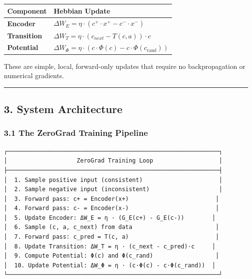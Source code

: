 \documentclass[
  11pt,
  a4paper,
]{article}
\begin{document}
\begin{longtable}[]{@{}
  >{\raggedright\arraybackslash}p{}
  >{\raggedright\arraybackslash}p{}@{}}
\toprule\noalign{}
\begin{minipage}[b]{\linewidth}\raggedright
Component
\end{minipage} & \begin{minipage}[b]{\linewidth}\raggedright
Hebbian Update
\end{minipage} \\
\midrule\noalign{}
\endhead
\bottomrule\noalign{}
\endlastfoot
\textbf{Encoder} &
\(\Delta W_E = \eta \cdot (c^+ \cdot x^+ - c^- \cdot x^-)\) \\
\textbf{Transition} &
\(\Delta W_T = \eta \cdot (c_{next} - T(c,a)) \cdot c\) \\
\textbf{Potential} &
\(\Delta W_\Phi = \eta \cdot (c \cdot \Phi(c) - c \cdot \Phi(c_{\text{rand}}))\) \\
\end{longtable}

These are simple, local, forward-only updates that require no
backpropagation or numerical gradients.

\begin{center}\rule{0.5\linewidth}{0.5pt}\end{center}

\subsection{3. System Architecture}\label{system-architecture}

\subsubsection{3.1 The ZeroGrad Training
Pipeline}\label{the-zerograd-training-pipeline}

\begin{verbatim}
┌─────────────────────────────────────────────────────────────┐
│                    ZeroGrad Training Loop                   │
├─────────────────────────────────────────────────────────────┤
│  1. Sample positive input (consistent)                      │
│  2. Sample negative input (inconsistent)                    │
│  3. Forward pass: c+ = Encoder(x+)                         │
│  4. Forward pass: c- = Encoder(x-)                         │
│  5. Update Encoder: ΔW_E = η · (G_E(c+) - G_E(c-))        │
│  6. Sample (c, a, c_next) from data                        │
│  7. Forward pass: c_pred = T(c, a)                         │
│  8. Update Transition: ΔW_T = η · (c_next - c_pred)·c     │
│  9. Compute Potential: Φ(c) and Φ(c_rand)                  │
│  10. Update Potential: ΔW_Φ = η · (c·Φ(c) - c·Φ(c_rand))  │
└─────────────────────────────────────────────────────────────┘
\end{verbatim}
\end{document}
